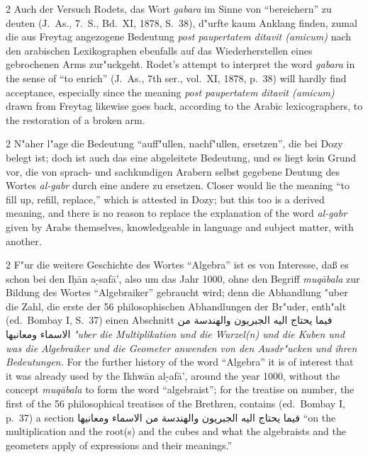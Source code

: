\documentclass[10pt,a4paper]{article}
\renewcommand{\switchcolumn}{\syncronize\nointerlineskip\columnbreak}
\newcommand{\RL}[1]{\beginR#1\endR}
\newcommand{\ar}[1]{{\arabicfont\RL{#1}}}
\newcommand{\s}[1]{\d{#1}}
\newcommand{\hw}{\d{h}}
\newcommand{\enquote}[1]{``#1''}
\begin{document}
\begin{paracol}{2}
Auch der Versuch Rodets, das Wort \textit{gabara} im Sinne von \enquote{bereichern} zu deuten (J.\ As., 7.\ S., Bd.\ XI, 1878, S.\ 38), d"urfte kaum Anklang finden, zumal die aus Freytag angezogene Bedeutung \textit{post paupertatem ditavit (amicum)} nach den arabischen Lexikographen ebenfalls auf das Wiederherstellen eines gebrochenen Arms zur"uckgeht.
\switchcolumn
Rodet's attempt to interpret the word \textit{gabara} in the sense of ``to enrich'' (J.\ As., 7th ser., vol.\ XI, 1878, p.\ 38) will hardly find acceptance, especially since the meaning \textit{post paupertatem ditavit (amicum)} drawn from Freytag likewise goes back, according to the Arabic lexicographers, to the restoration of a broken arm.
\end{paracol}

\begin{paracol}{2}
N"aher l"age die Bedeutung \enquote{auff"ullen, nachf"ullen, ersetzen}, die bei Dozy belegt ist; doch ist auch das eine abgeleitete Bedeutung, und es liegt kein Grund vor, die von sprach- und sachkundigen Arabern selbst gegebene Deutung des Wortes \textit{al-gabr} durch eine andere zu ersetzen.
\switchcolumn
Closer would lie the meaning ``to fill up, refill, replace,'' which is attested in Dozy; but this too is a derived meaning, and there is no reason to replace the explanation of the word \textit{al-gabr} given by Arabs themselves, knowledgeable in language and subject matter, with another.
\end{paracol}

\begin{paracol}{2}
F"ur die weitere Geschichte des Wortes \enquote{Algebra} ist es von Interesse, da\ss{} es schon bei den I\hw{}\=an a\s-s{}af\=a', also um das Jahr 1000, ohne den Begriff \textit{muq\=abala} zur Bildung des Wortes \enquote{Algebraiker} gebraucht wird; denn die Abhandlung "uber die Zahl, die erste der 56 philosophischen Abhandlungen der Br"uder, enth"alt (ed.\ Bombay I, S.\ 37) einen Abschnitt \ar{فيما يحتاج اليه الجبريون والهندسة من الاسماء ومعانيها} \textit{"uber die Multiplikation und die Wurzel(n) und die Kuben und was die Algebraiker und die Geometer anwenden von den Ausdr"ucken und ihren Bedeutungen.}
\switchcolumn
For the further history of the word ``Algebra'' it is of interest that it was already used by the Ikhw\=an al-\s{}af\=a', around the year 1000, without the concept \textit{muq\=abala} to form the word ``algebraist''; for the treatise on number, the first of the 56 philosophical treatises of the Brethren, contains (ed.\ Bombay I, p.\ 37) a section \ar{فيما يحتاج اليه الجبريون والهندسة من الاسماء ومعانيها} ``on the multiplication and the root(s) and the cubes and what the algebraists and the geometers apply of expressions and their meanings.''
\end{paracol}
\end{document}
